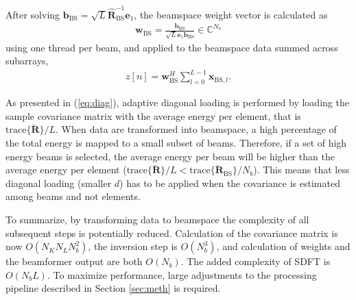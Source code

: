 \documentclass[journal]{IEEEtran}
\newcommand{\mat}[1]{\mathbf{#1}}
\renewcommand{\vec}[1]{\mathbf{#1}}
\begin{document}
After solving $\vec{b}_\text{BS} = \sqrt{L}\mat{\hat{R}}_\text{BS}^{-1}\vec{e}_1$, the beamspace weight vector is calculated as 
\begin{align}
\vec{w}_\text{BS} = \frac{\vec{b}_\text{BS}}{\sqrt{L}\vec{e}_1\vec{b}_\text{BS}} \in \mathbb{C}^{N_b}
\end{align}  
using one thread per beam, and applied to the beamspace data summed across subarrays,
\begin{align}
z[n] = \vec{w}_\text{BS}^H\sum_{l=0}^{L-1}\vec{x}_{\text{BS},l}. 
\end{align}


As presented in (\ref{eq:diag}), adaptive diagonal loading is performed by loading the sample covariance matrix with the average energy per element, that is $\text{trace}\{\mat{\breve{R}}\}/L$. When data are transformed into beamspace, a high percentage of the total energy is mapped to a small subset of beams. Therefore, if a set of high energy beams is selected, the average energy per beam will be higher than the average energy per element ($\text{trace}\{\mat{\breve{R}}\}/L < \text{trace}\{\mat{\breve{R}}_{\text{BS}}\}/N_b$). This means that less diagonal loading (smaller $d$) has to be applied when the covariance is estimated among beams and not elements. 

To summarize, by transforming data to beamspace the complexity of all subsequent steps is potentially reduced. Calculation of the covariance matrix is now $O(N_KN_LN_b^2)$, the inversion step is $O(N_b^3)$, and calculation of weights and the beamformer output are both $O(N_b)$. The added complexity of SDFT is $O(N_bL)$. To maximize performance, large adjustments to the processing pipeline described in Section \ref{sec:meth} is required. 



\end{document}

